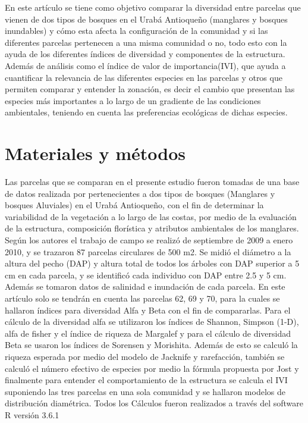 \documentclass[conference,final,12pt,]{IEEEtran}
\begin{document}
En este artículo se tiene como objetivo comparar la diversidad entre
parcelas que vienen de dos tipos de bosques en el Urabá Antioqueño
(manglares y bosques inundables) y cómo esta afecta la configuración de
la comunidad y si las diferentes parcelas pertenecen a una misma
comunidad o no, todo esto con la ayuda de los diferentes índices de
diversidad y componentes de la estructura. Además de análisis como el
índice de valor de importancia(IVI), que ayuda a cuantificar la
relevancia de las diferentes especies en las parcelas y otros que
permiten comparar y entender la zonación, es decir el cambio que
presentan las especies más importantes a lo largo de un gradiente de las
condiciones ambientales, teniendo en cuenta las preferencias ecológicas
de dichas especies.

\hypertarget{materiales-y-muxe9todos}{%
\section{Materiales y métodos}\label{materiales-y-muxe9todos}}

Las parcelas que se comparan en el presente estudio fueron tomadas de
una base de datos realizada por \citep{AB} pertenecientes a dos tipos de
bosques (Manglares y bosques Aluviales) en el Urabá Antioqueño, con el
fin de determinar la variabilidad de la vegetación a lo largo de las
costas, por medio de la evaluación de la estructura, composición
florística y atributos ambientales de los manglares. Según los autores
el trabajo de campo se realizó de septiembre de 2009 a enero 2010, y se
trazaron 87 parcelas circulares de 500 m2. Se midió el diámetro a la
altura del pecho (DAP) y altura total de todos los árboles con DAP
superior a 5 cm en cada parcela, y se identificó cada individuo con DAP
entre 2.5 y 5 cm. Además se tomaron datos de salinidad e inundación de
cada parcela. En este artículo solo se tendrán en cuenta las parcelas
62, 69 y 70, para la cuales se hallaron índices para diversidad Alfa y
Beta con el fin de compararlas. Para el cálculo de la diversidad alfa se
utilizaron los índices de Shannon, Simpson (1-D), alfa de fisher y el
índice de riqueza de Margalef y para el cálculo de diversidad Beta se
usaron los índices de Sorensen y Morishita. Además de esto se calculó la
riqueza esperada por medio del modelo de Jacknife y rarefacción, también
se calculó el número efectivo de especies por medio la fórmula propuesta
por Jost y finalmente para entender el comportamiento de la estructura
se calcula el IVI suponiendo las tres parcelas en una sola comunidad y
se hallaron modelos de distribución diamétrica. Todos los Cálculos
fueron realizados a través del software R versión 3.6.1
\end{document}
